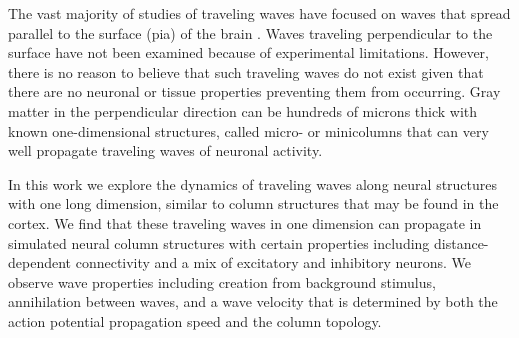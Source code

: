 \documentclass[a4paper,11pt]{article}
\begin{document}
The vast majority of studies of traveling waves have focused on waves that spread parallel to the surface (pia) of the brain \cite{muller2018}. 
Waves traveling perpendicular to the surface have not been examined because of experimental limitations. 
However, there is no reason to believe that such traveling waves do not exist given that there are no neuronal or tissue properties preventing them from occurring. 
Gray matter in the perpendicular direction can be hundreds of microns thick with known one-dimensional structures, called micro- or minicolumns\cite{cruz2000} that can very well propagate traveling waves of neuronal activity.

In this work we explore the dynamics of traveling waves along neural structures with one long dimension, similar to column structures that may be found in the cortex.
We find that these traveling waves in one dimension can propagate in simulated neural column structures with certain properties including distance-dependent connectivity and a mix of excitatory and inhibitory neurons. 
We observe wave properties including creation from background stimulus, annihilation between waves, and a wave velocity that is determined by both the action potential propagation speed and the column topology. 
\end{document}
